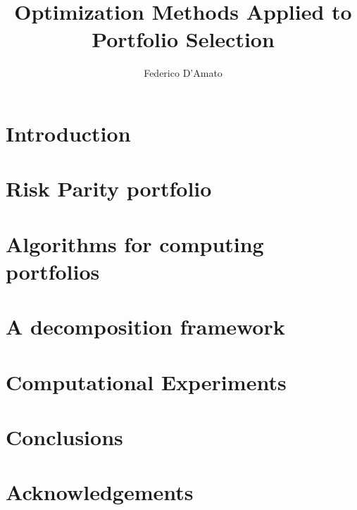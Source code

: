 \documentclass[a4paper,12pt,oneside]{book}
\title{Optimization Methods Applied to Portfolio Selection}
\author{Federico D'Amato}
\numberwithin{equation}{section}
\begin{document}
 
\maketitle\clearpage
\tableofcontents\clearpage

\chapter{Introduction}



\chapter{Risk Parity portfolio}



\chapter{Algorithms for computing portfolios}


\chapter{A decomposition framework}



\chapter{Computational Experiments}


\chapter{Conclusions}
\chapter{Acknowledgements}
\clearpage
\end{document}
